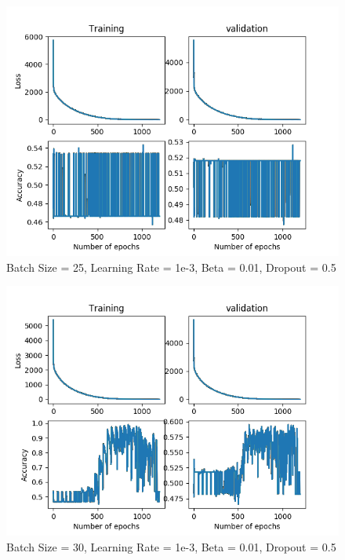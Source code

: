 \documentclass[12pt,reqno]{amsart}
\numberwithin{equation}{section}
\begin{document}
\begin{enumerate}
\begin{figure}[H]
\centering
\includegraphics[scale=0.6]{data12-1e-3-25-1e-2-5e-1}
\caption{Batch Size = 25, Learning Rate = 1e-3, Beta = 0.01, Dropout = 0.5}
\end{figure}

\begin{figure}[H]
\centering
\includegraphics[scale=0.6]{data12-1e-3-30-1e-2-5e-1}
\caption{Batch Size = 30, Learning Rate = 1e-3, Beta = 0.01, Dropout = 0.5}
\end{figure}


\end{enumerate}
\end{document}
